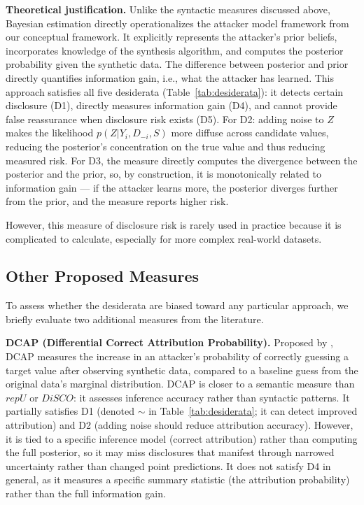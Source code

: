 \documentclass[Afour,sageh,times,doublespace]{sagej}
\begin{document}
\textbf{Theoretical justification.} Unlike the syntactic measures discussed above, Bayesian estimation directly operationalizes the attacker model framework from our conceptual framework. It explicitly represents the attacker's prior beliefs, incorporates knowledge of the synthesis algorithm, and computes the posterior probability given the synthetic data. The difference between posterior and prior directly quantifies information gain, i.e., what the attacker has learned. This approach satisfies all five desiderata (Table~\ref{tab:desiderata}): it detects certain disclosure (D1), directly measures information gain (D4), and cannot provide false reassurance when disclosure risk exists (D5). For D2: adding noise to $Z$ makes the likelihood $p(Z | Y_i, D_{-i}, S)$ more diffuse across candidate values, reducing the posterior's concentration on the true value and thus reducing measured risk. For D3, the measure directly computes the divergence between the posterior and the prior, so, by construction, it is monotonically related to information gain --- if the attacker learns more, the posterior diverges further from the prior, and the measure reports higher risk.

However, this measure of disclosure risk is rarely used in practice because it is complicated to calculate, especially for more complex real-world datasets.

\subsection{Other Proposed Measures}
\label{sec:other_measures}

To assess whether the desiderata are biased toward any particular approach, we briefly evaluate two additional measures from the literature.

\textbf{DCAP (Differential Correct Attribution Probability).} Proposed by \citet{Taub2018}, DCAP measures the increase in an attacker's probability of correctly guessing a target value after observing synthetic data, compared to a baseline guess from the original data's marginal distribution. DCAP is closer to a semantic measure than $repU$ or $DiSCO$: it assesses inference accuracy rather than syntactic patterns. It partially satisfies D1 (denoted $\sim$ in Table~\ref{tab:desiderata}; it can detect improved attribution) and D2 (adding noise should reduce attribution accuracy). However, it is tied to a specific inference model (correct attribution) rather than computing the full posterior, so it may miss disclosures that manifest through narrowed uncertainty rather than changed point predictions. It does not satisfy D4 in general, as it measures a specific summary statistic (the attribution probability) rather than the full information gain.
\end{document}
